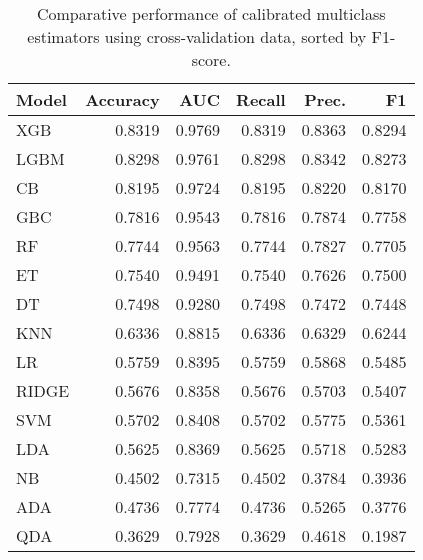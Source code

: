 \begin{table}
\caption{Comparative performance of calibrated multiclass estimators using cross-validation data, sorted by F1-score.}
\label{tbl:multiclass_cv_res_calibrated_models_df}
\begin{tabular}{lrrrrr}
\toprule
Model & Accuracy & AUC & Recall & Prec. & F1 \\
\midrule
XGB & 0.8319 & 0.9769 & 0.8319 & 0.8363 & 0.8294 \\
LGBM & 0.8298 & 0.9761 & 0.8298 & 0.8342 & 0.8273 \\
CB & 0.8195 & 0.9724 & 0.8195 & 0.8220 & 0.8170 \\
GBC & 0.7816 & 0.9543 & 0.7816 & 0.7874 & 0.7758 \\
RF & 0.7744 & 0.9563 & 0.7744 & 0.7827 & 0.7705 \\
ET & 0.7540 & 0.9491 & 0.7540 & 0.7626 & 0.7500 \\
DT & 0.7498 & 0.9280 & 0.7498 & 0.7472 & 0.7448 \\
KNN & 0.6336 & 0.8815 & 0.6336 & 0.6329 & 0.6244 \\
LR & 0.5759 & 0.8395 & 0.5759 & 0.5868 & 0.5485 \\
RIDGE & 0.5676 & 0.8358 & 0.5676 & 0.5703 & 0.5407 \\
SVM & 0.5702 & 0.8408 & 0.5702 & 0.5775 & 0.5361 \\
LDA & 0.5625 & 0.8369 & 0.5625 & 0.5718 & 0.5283 \\
NB & 0.4502 & 0.7315 & 0.4502 & 0.3784 & 0.3936 \\
ADA & 0.4736 & 0.7774 & 0.4736 & 0.5265 & 0.3776 \\
QDA & 0.3629 & 0.7928 & 0.3629 & 0.4618 & 0.1987 \\
\bottomrule
\end{tabular}
\end{table}
